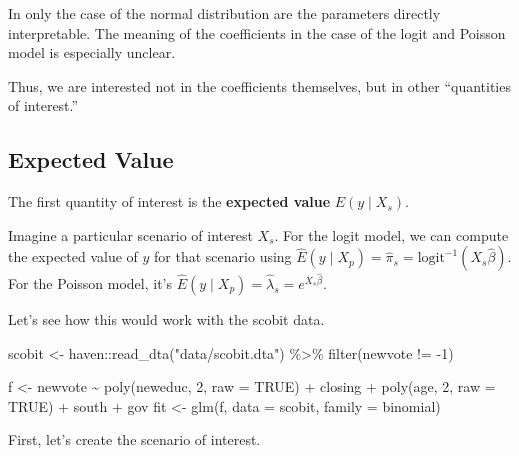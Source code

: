 \documentclass[
]{book}
\newenvironment{Shaded}{\begin{snugshade}}{\end{snugshade}}
\newcommand{\AttributeTok}[1]{\textcolor[rgb]{0.77,0.63,0.00}{#1}}
\newcommand{\ConstantTok}[1]{\textcolor[rgb]{0.00,0.00,0.00}{#1}}
\newcommand{\DecValTok}[1]{\textcolor[rgb]{0.00,0.00,0.81}{#1}}
\newcommand{\FunctionTok}[1]{\textcolor[rgb]{0.00,0.00,0.00}{#1}}
\newcommand{\NormalTok}[1]{#1}
\newcommand{\OtherTok}[1]{\textcolor[rgb]{0.56,0.35,0.01}{#1}}
\newcommand{\SpecialCharTok}[1]{\textcolor[rgb]{0.00,0.00,0.00}{#1}}
\newcommand{\StringTok}[1]{\textcolor[rgb]{0.31,0.60,0.02}{#1}}
\begin{document}
In only the case of the normal distribution are the parameters directly interpretable. The meaning of the coefficients in the case of the logit and Poisson model is especially unclear.

Thus, we are interested not in the coefficients themselves, but in other ``quantities of interest.''

\hypertarget{expected-value}{%
\subsection{Expected Value}\label{expected-value}}

The first quantity of interest is the \textbf{expected value} \(E(y \mid X_s)\).

Imagine a particular scenario of interest \(X_s\). For the logit model, we can compute the expected value of \(y\) for that scenario using \(\hat{E}(y \mid X_p) = \hat{\pi}_s = \text{logit}^{-1}(X_s\hat{\beta})\). For the Poisson model, it's \(\hat{E}(y \mid X_p) = \hat{\lambda}_s = e^{X_s\hat{\beta}}\).

Let's see how this would work with the scobit data.

\begin{Shaded}
\begin{Highlighting}[]
\NormalTok{scobit }\OtherTok{\textless{}{-}}\NormalTok{ haven}\SpecialCharTok{::}\FunctionTok{read\_dta}\NormalTok{(}\StringTok{"data/scobit.dta"}\NormalTok{) }\SpecialCharTok{\%\textgreater{}\%}
  \FunctionTok{filter}\NormalTok{(newvote }\SpecialCharTok{!=} \SpecialCharTok{{-}}\DecValTok{1}\NormalTok{) }

\NormalTok{f }\OtherTok{\textless{}{-}}\NormalTok{ newvote }\SpecialCharTok{\textasciitilde{}} \FunctionTok{poly}\NormalTok{(neweduc, }\DecValTok{2}\NormalTok{, }\AttributeTok{raw =} \ConstantTok{TRUE}\NormalTok{) }\SpecialCharTok{+}\NormalTok{ closing }\SpecialCharTok{+} \FunctionTok{poly}\NormalTok{(age, }\DecValTok{2}\NormalTok{, }\AttributeTok{raw =} \ConstantTok{TRUE}\NormalTok{) }\SpecialCharTok{+}\NormalTok{ south }\SpecialCharTok{+}\NormalTok{ gov}
\NormalTok{fit }\OtherTok{\textless{}{-}} \FunctionTok{glm}\NormalTok{(f, }\AttributeTok{data =}\NormalTok{ scobit, }\AttributeTok{family =}\NormalTok{ binomial)}
\end{Highlighting}
\end{Shaded}

First, let's create the scenario of interest.
\end{document}
